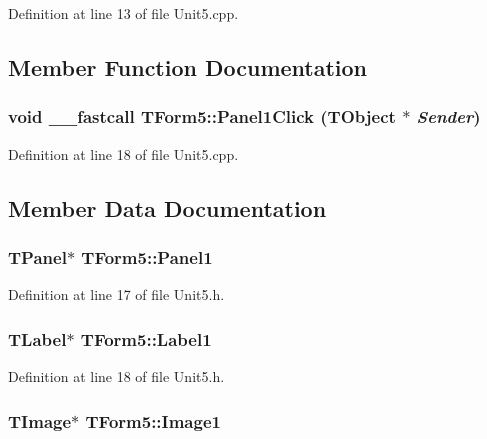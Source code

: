 Definition at line 13 of file Unit5.cpp.

\subsection{Member Function Documentation}
\hypertarget{classTForm5_91989532e25631f0a8580634682c2519}{
\subsubsection[Panel1Click]{\setlength{\rightskip}{0pt plus 5cm}void \_\-\_\-fastcall TForm5::Panel1Click (TObject $\ast$ {\em Sender})}}
\label{classTForm5_91989532e25631f0a8580634682c2519}




Definition at line 18 of file Unit5.cpp.

\subsection{Member Data Documentation}
\hypertarget{classTForm5_f905ba8b8a01b2e6744406a0735ad9cd}{
\subsubsection[Panel1]{\setlength{\rightskip}{0pt plus 5cm}TPanel$\ast$ {\bf TForm5::Panel1}}}
\label{classTForm5_f905ba8b8a01b2e6744406a0735ad9cd}




Definition at line 17 of file Unit5.h.\hypertarget{classTForm5_04f867fff2d21e3d0e6c0bec5fd87fb1}{
\subsubsection[Label1]{\setlength{\rightskip}{0pt plus 5cm}TLabel$\ast$ {\bf TForm5::Label1}}}
\label{classTForm5_04f867fff2d21e3d0e6c0bec5fd87fb1}




Definition at line 18 of file Unit5.h.\hypertarget{classTForm5_bdfd77027c4fd4045308e27b43b8862e}{
\subsubsection[Image1]{\setlength{\rightskip}{0pt plus 5cm}TImage$\ast$ {\bf TForm5::Image1}}}
\label{classTForm5_bdfd77027c4fd4045308e27b43b8862e}




